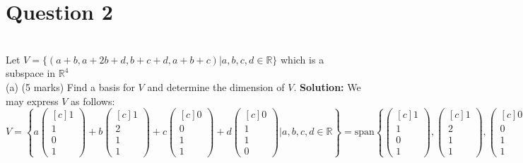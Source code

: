 \documentclass{article}
\begin{document}
\section*{Question 2}
\newline
\\ Let $V = \{ (a + b, a + 2b + d, b + c + d, a + b + c) | a, b, c, d \in \mathbb{R} \}$ which is a subspace in $\mathbb{R}^4$ 
\newline
\\ (a)  (5 marks) Find a basis for $V$ and determine the dimension of $V$.
\newline
\textbf{Solution:}
We may express $V$ as follows:
$$V = \left\{ 
a\begin{pmatrix}[c] 1 \\ 1 \\ 0 \\ 1 \end{pmatrix} + b\begin{pmatrix}[c] 1 \\ 2 \\ 1 \\ 1 \end{pmatrix} + c\begin{pmatrix}[c] 0 \\ 0 \\ 1 \\ 1 \end{pmatrix} + d\begin{pmatrix}[c] 0 \\ 1 \\ 1 \\ 0 \end{pmatrix}\Bigg|  a, b, c, d \in \mathbb{R} \right\} =\text{span}\left\{ 
\begin{pmatrix}[c] 1 \\ 1 \\ 0 \\ 1 \end{pmatrix}, \begin{pmatrix}[c] 1 \\ 2 \\ 1 \\ 1 \end{pmatrix}, \begin{pmatrix}[c] 0 \\ 0 \\ 1 \\ 1 \end{pmatrix}, \begin{pmatrix}[c] 0 \\ 1 \\ 1 \\ 0 \end{pmatrix}\right\}$$
\end{document}
